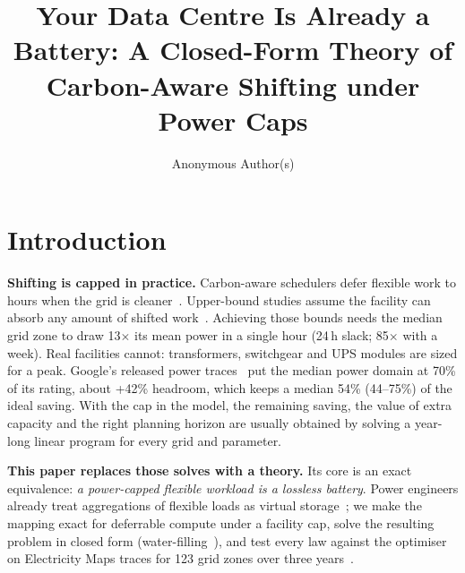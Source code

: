 \documentclass[acmsmall,review,anonymous]{acmart}
\title{Your Data Centre Is Already a Battery: A Closed-Form Theory of Carbon-Aware Shifting under Power Caps}
\author{Anonymous Author(s)}
\affiliation{\institution{Submission for double-blind review}\country{}}
\theoremstyle{definition}
\begin{document}
\maketitle

\section{Introduction}
\textbf{Shifting is capped in practice.} Carbon-aware schedulers defer flexible work to hours
when the grid is cleaner~\cite{radovanovic2021carbonaware,wiesner2021lets,sukprasert2024on}.
Upper-bound studies assume the facility can absorb any amount of shifted
work~\cite{sukprasert2024on}. Achieving those bounds needs the median grid zone to draw
13$\times$ its mean power in a single hour (24\,h slack; 85$\times$ with a week). Real facilities
cannot: transformers, switchgear and UPS modules are sized for a peak. Google's released power
traces~\cite{sakalkar2019data} put the median power domain at 70\% of its rating, about +42\%
headroom, which keeps a median 54\% (44--75\%) of the ideal saving. With the cap in the model,
the remaining saving, the value of extra capacity and the right planning horizon are usually
obtained by solving a year-long linear program for every grid and parameter.

\textbf{This paper replaces those solves with a theory.} Its core is an exact equivalence:
\emph{a power-capped flexible workload is a lossless battery}. Power engineers already treat
aggregations of flexible loads as virtual storage~\cite{callaway2011achieving,hao2015aggregate};
we make the mapping exact for deferrable compute under a facility cap, solve the resulting problem
in closed form (water-filling~\cite{cover2006elements}), and test every law against the optimiser
on Electricity Maps traces for 123 grid zones over three years~\cite{maps2022hourly}.
\end{document}
